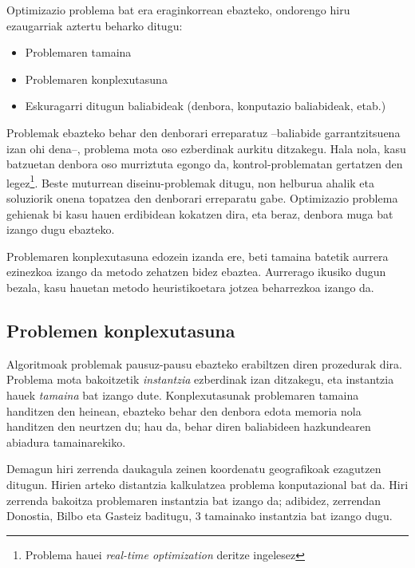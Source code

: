 \documentclass[eu]{ifirak}\usepackage[]{graphicx}\usepackage[]{color}
\begin{document}
Optimizazio problema bat era eraginkorrean ebazteko, ondorengo hiru ezaugarriak aztertu beharko ditugu:

\begin{itemize}
\item Problemaren tamaina
\item Problemaren konplexutasuna
\item Eskuragarri ditugun baliabideak (denbora, konputazio baliabideak, etab.)
\end{itemize}

Problemak ebazteko behar den denborari erreparatuz --baliabide garrantzitsuena izan ohi dena--, problema mota oso ezberdinak aurkitu ditzakegu. Hala nola, kasu batzuetan denbora oso murriztuta egongo da, kontrol-problematan gertatzen den legez\footnote{Problema hauei \textit{real-time optimization} deritze ingelesez}. Beste muturrean diseinu-problemak ditugu, non helburua ahalik eta soluziorik onena topatzea den denborari erreparatu gabe. Optimizazio problema gehienak bi kasu hauen erdibidean kokatzen dira, eta beraz, denbora muga bat izango dugu ebazteko. 

Problemaren konplexutasuna edozein izanda ere, beti tamaina batetik aurrera ezinezkoa izango da metodo zehatzen bidez ebaztea. Aurrerago ikusiko dugun bezala, kasu hauetan metodo heuristikoetara jotzea beharrezkoa izango da.

\subsection{Problemen konplexutasuna}

Algoritmoak problemak pausuz-pausu ebazteko erabiltzen diren prozedurak dira. Problema mota bakoitzetik \textit{instantzia} ezberdinak izan ditzakegu, eta instantzia hauek \textit{tamaina} bat izango dute. Konplexutasunak problemaren tamaina handitzen den heinean, ebazteko behar den denbora edota memoria nola handitzen den neurtzen du; hau da, behar diren baliabideen hazkundearen abiadura tamainarekiko.

\begin{tcolorbox}
\begin{ifexample}
Demagun hiri zerrenda daukagula zeinen koordenatu geografikoak ezagutzen ditugun. Hirien arteko distantzia kalkulatzea problema konputazional bat da. Hiri zerrenda bakoitza problemaren instantzia bat izango da; adibidez, zerrendan Donostia, Bilbo eta Gasteiz baditugu, 3 tamainako instantzia bat izango dugu.
\end{ifexample}
\end{tcolorbox}
\end{document}
